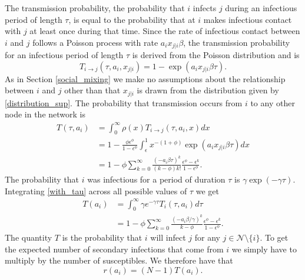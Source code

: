 \documentclass[twocolumn,8pt]{article}
\begin{document}
The transmission probability, the probability that $i$ infects $j$ during an infectious period of length $\tau$, is equal to the probability that at $i$ makes infectious contact with $j$ at least once during that time. Since the rate of infectious contact between $i$ and $j$ follows a Poisson process with rate $a_{i}x_{j|i}\beta$, the transmission probability for an infectious period of length $\tau$ is derived from the Poisson distribution and is
\begin{equation}
T_{i\rightarrow j}(\tau,a_{i},x_{j|i})=1-\exp(a_{i}x_{j|i}\beta\tau).
\end{equation}
As in Section \ref{social_mixing} we make no assumptions about the relationship between $i$ and $j$ other than that $x_{j|i}$ is drawn from the distribution given by \eqref{distribution_sup}. The probability that transmission occurs from $i$ to any other node in the network is
\begin{equation}
\label{with_tau}
\begin{split}
T(\tau,a_{i})&=\int_{0}^{\infty}\rho(x)T_{i\rightarrow j}(\tau,a_{i},x)dx\\[10pt]
&=1-\frac{\phi\epsilon^{\phi}}{1-\epsilon^{\phi}}\int_{\epsilon}^{1}x^{-(1+\phi)}\exp(a_{i}x_{j|i}\beta\tau)dx\\[10pt]
&=1-\phi\sum_{k=0}^{\infty}\frac{(-a_{i}\beta\tau)^{k}}{(k-\phi)k!}\frac{\epsilon^{\phi}-\epsilon^{k}}{1-\epsilon^{\phi}}.
\end{split}
\end{equation}
The probability that $i$ was infectious for a period of duration $\tau$ is $\gamma\exp(-\gamma\tau)$. Integrating \eqref{with_tau} across all possible values of $\tau$ we get
\begin{equation}
\label{without_tau}
\begin{split}
T(a_{i})&=\int_{0}^{\infty}\gamma e^{-\gamma\tau}T_{i}(\tau,a_{i})d\tau\\[10pt]
&=1-\phi\sum_{k=0}^{\infty}\frac{(-a_{i}\beta/\gamma)^{k}}{k-\phi}\frac{\epsilon^{\phi}-\epsilon^{k}}{1-\epsilon^{\phi}}.
\end{split}
\end{equation}
The quantity $T$ is the probability that $i$ will infect $j$ for any $j\in\mathcal{N}\setminus\{i\}$. To get the expected number of secondary infections that come from $i$ we simply have to multiply by the number of susceptibles. We therefore have that 
\begin{equation}
\label{r_i_1}
r(a_{i})=(N-1)T(a_{i}).
\end{equation}
\end{document}
